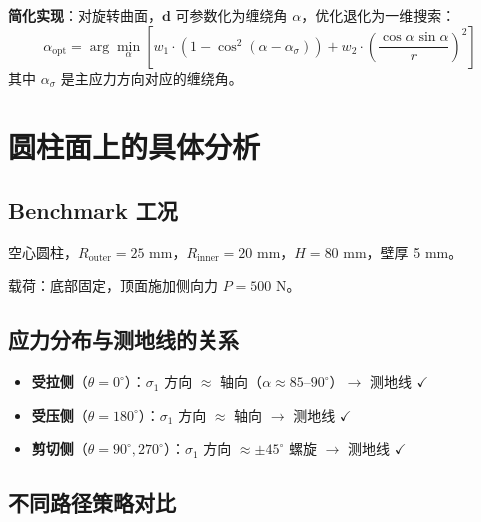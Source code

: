 \documentclass[11pt,a4paper]{article}
\begin{document}
\textcolor{accent}{\textbf{简化实现}}：对旋转曲面，$\mathbf{d}$ 可参数化为缠绕角 $\alpha$，优化退化为一维搜索：
\begin{equation}
\alpha_{\text{opt}} = \arg\min_\alpha \left[ w_1 \cdot \left(1 - \cos^2(\alpha - \alpha_\sigma)\right) + w_2 \cdot \left(\frac{\cos\alpha\sin\alpha}{r}\right)^2 \right]
\end{equation}
其中 $\alpha_\sigma$ 是主应力方向对应的缠绕角。


\section{圆柱面上的具体分析}

\subsection{Benchmark 工况}

空心圆柱，$R_{\text{outer}} = 25$ mm，$R_{\text{inner}} = 20$ mm，$H = 80$ mm，壁厚 5 mm。

载荷：底部固定，顶面施加侧向力 $P = 500$ N。

\subsection{应力分布与测地线的关系}

\begin{itemize}[nosep]
\item \textbf{受拉侧}（$\theta = 0^\circ$）：$\sigma_1$ 方向 $\approx$ 轴向（$\alpha \approx 85\text{--}90^\circ$）$\to$ 测地线 $\checkmark$
\item \textbf{受压侧}（$\theta = 180^\circ$）：$\sigma_1$ 方向 $\approx$ 轴向 $\to$ 测地线 $\checkmark$
\item \textbf{剪切侧}（$\theta = 90^\circ, 270^\circ$）：$\sigma_1$ 方向 $\approx \pm 45^\circ$ 螺旋 $\to$ 测地线 $\checkmark$
\end{itemize}

\noindent{}

\subsection{不同路径策略对比}
\end{document}
